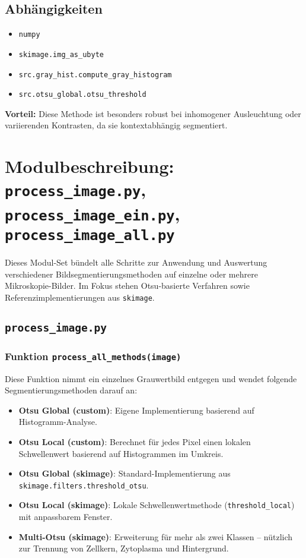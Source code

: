 \documentclass[a4paper,12pt]{article}
\begin{document}
\subsection*{Abhängigkeiten}
\begin{itemize}
  \item \texttt{numpy}
  \item \texttt{skimage.img\_as\_ubyte}
  \item \texttt{src.gray\_hist.compute\_gray\_histogram}
  \item \texttt{src.otsu\_global.otsu\_threshold}
\end{itemize}

\textbf{Vorteil:} Diese Methode ist besonders robust bei inhomogener Ausleuchtung oder variierenden Kontrasten, da sie kontextabhängig segmentiert.


\section*{ Modulbeschreibung: \texttt{process\_image.py}, \texttt{process\_image\_ein.py}, \texttt{process\_image\_all.py}}

Dieses Modul-Set bündelt alle Schritte zur Anwendung und Auswertung verschiedener Bildsegmentierungsmethoden auf einzelne oder mehrere Mikroskopie-Bilder. Im Fokus stehen Otsu-basierte Verfahren sowie Referenzimplementierungen aus \texttt{skimage}.

\subsection*{ \texttt{process\_image.py}}

\subsubsection*{Funktion \texttt{process\_all\_methods(image)}}

Diese Funktion nimmt ein einzelnes Grauwertbild entgegen und wendet folgende Segmentierungsmethoden darauf an:

\begin{itemize}
  \item \textbf{Otsu Global (custom)}: Eigene Implementierung basierend auf Histogramm-Analyse.
  \item \textbf{Otsu Local (custom)}: Berechnet für jedes Pixel einen lokalen Schwellenwert basierend auf Histogrammen im Umkreis.
  \item \textbf{Otsu Global (skimage)}: Standard-Implementierung aus \texttt{skimage.filters.threshold\_otsu}.
  \item \textbf{Otsu Local (skimage)}: Lokale Schwellenwertmethode (\texttt{threshold\_local}) mit anpassbarem Fenster.
  \item \textbf{Multi-Otsu (skimage)}: Erweiterung für mehr als zwei Klassen – nützlich zur Trennung von Zellkern, Zytoplasma und Hintergrund.
\end{itemize}
\end{document}
